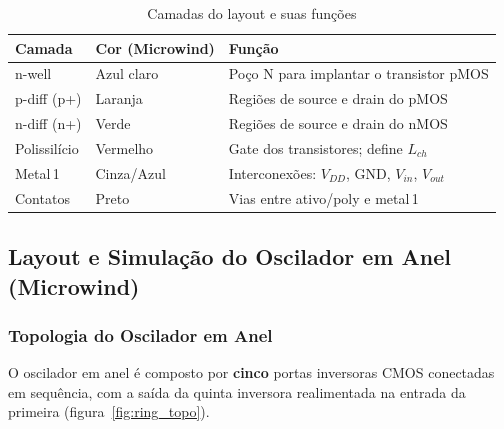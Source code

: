 \documentclass[12pt,a4paper]{article}
\begin{document}
\begin{table}[H]
  \centering
  \caption{Camadas do layout e suas funções}
  \label{tab:camadas}
  \begin{tabular}{lll}
    \toprule
    \textbf{Camada} & \textbf{Cor (Microwind)} & \textbf{Função} \\
    \midrule
    n-well          & Azul claro  & Poço N para implantar o transistor pMOS \\
    p-diff (p+)     & Laranja     & Regiões de source e drain do pMOS \\
    n-diff (n+)     & Verde       & Regiões de source e drain do nMOS \\
    Polissilício    & Vermelho    & Gate dos transistores; define $L_{ch}$ \\
    Metal\,1        & Cinza/Azul  & Interconexões: $V_{DD}$, GND, $V_{in}$, $V_{out}$ \\
    Contatos        & Preto       & Vias entre ativo/poly e metal\,1 \\
    \bottomrule
  \end{tabular}
\end{table}

\subsection{Layout e Simulação do Oscilador em Anel (Microwind)}

\subsubsection{Topologia do Oscilador em Anel}

O oscilador em anel é composto por \textbf{cinco} portas inversoras CMOS conectadas
em sequência, com a saída da quinta inversora realimentada na entrada da primeira
(figura~\ref{fig:ring_topo}).
\end{document}
